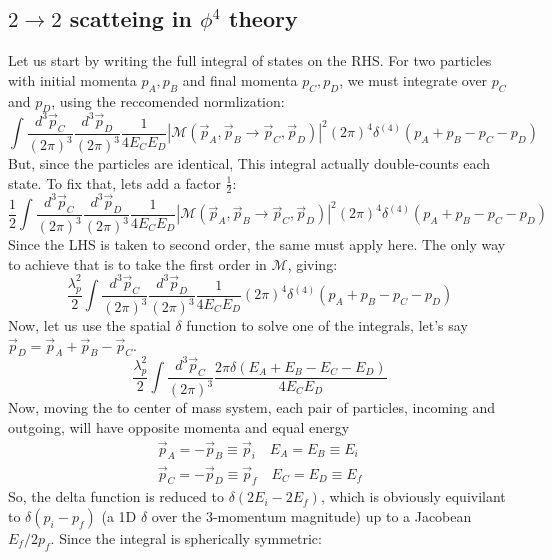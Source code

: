 \documentclass{article}
\begin{document}
\subsection{$2\rightarrow2$ scatteing in $\phi^4$ theory}
Let us start by writing the full integral of states on the RHS. For two particles with initial momenta $p_A, p_B$ and final momenta $p_C, p_D$, we must integrate over $p_C$ and $p_D$, using the reccomended normlization:
\begin{equation}
    \int \frac{d^3\vec{p}_C}{(2\pi)^3} \frac{d^3\vec{p}_D}{(2\pi)^3} \frac{1}{4E_CE_D} \left|\mathcal{M}(\vec{p}_A, \vec{p}_B \rightarrow \vec{p}_C, \vec{p}_D)\right|^2 (2\pi)^4\delta^{(4)}(p_A + p_B - p_C - p_D)
\end{equation}
But, since the particles are identical, This integral actually double-counts each state. To fix that, lets add a factor $\frac{1}{2}$:
\begin{equation}
    \frac{1}{2}\int \frac{d^3\vec{p}_C}{(2\pi)^3} \frac{d^3\vec{p}_D}{(2\pi)^3} \frac{1}{4E_CE_D} \left|\mathcal{M}(\vec{p}_A, \vec{p}_B \rightarrow \vec{p}_C, \vec{p}_D)\right|^2 (2\pi)^4\delta^{(4)}(p_A + p_B - p_C - p_D)
\end{equation}
Since the LHS is taken to second order, the same must apply here. The only way to achieve that is to take the first order in $\mathcal{M}$, giving:
\begin{equation}
    \frac{\lambda_p^2}{2}\int \frac{d^3\vec{p}_C}{(2\pi)^3} \frac{d^3\vec{p}_D}{(2\pi)^3} \frac{1}{4E_CE_D} (2\pi)^4\delta^{(4)}(p_A + p_B - p_C - p_D)
\end{equation}
Now, let us use the spatial $\delta$ function to solve one of the integrals, let's say $\vec{p}_D = \vec{p}_A + \vec{p}_B - \vec{p}_C$.
\begin{equation}
    \frac{\lambda_p^2}{2}\int \frac{d^3\vec{p}_C}{(2\pi)^3} \frac{2\pi \delta(E_A + E_B - E_C - E_D)}{4E_CE_D}
\end{equation}
Now, moving the to center of mass system, each pair of particles, incoming and outgoing, will have opposite momenta and equal energy
\begin{equation}
\begin{gathered}
    \vec{p}_A = -\vec{p}_B \equiv \vec{p}_i
    \quad
    E_A = E_B \equiv E_i
    \\
    \vec{p}_C = -\vec{p}_D \equiv \vec{p}_f
    \quad
    E_C = E_D \equiv E_f
\end{gathered}
\end{equation}
So, the delta function is reduced to $\delta(2E_i - 2E_f)$, which is obviously equivilant to $\delta(p_i - p_f)$ (a 1D $\delta$ over the 3-momentum magnitude) up to a Jacobean $E_f/2p_f$. Since the integral is spherically symmetric:
\end{document}
